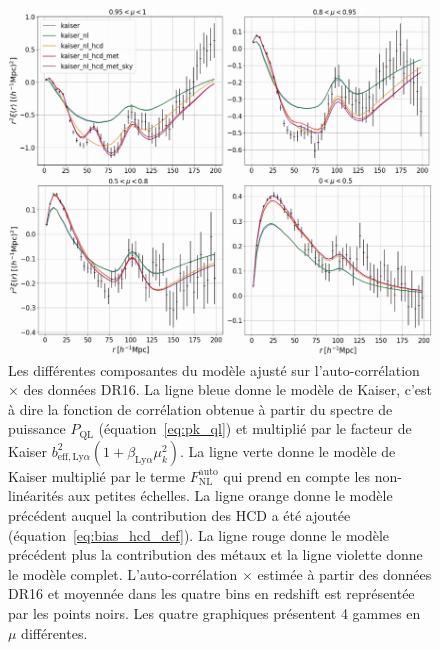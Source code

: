 \begin{figure}
  \centering
  \includegraphics[scale=0.5]{cf_models}
  \caption{Les différentes composantes du modèle ajusté sur l'auto-corrélation \lya{}$\times$\lya{} des données DR16.
    La ligne bleue donne le modèle de Kaiser, c'est à dire la fonction de corrélation obtenue à partir du spectre de puissance $P_{\mathrm{QL}}$ (équation~\ref{eq:pk_ql}) et multiplié par le facteur de Kaiser $b_{\mathrm{eff},\mathrm{Ly}\alpha}^2 (1 + \beta_{\mathrm{Ly}\alpha} \mu_k^2)$. La ligne verte donne le modèle de Kaiser multiplié par le terme $F_{\mathrm{NL}}^{\mathrm{auto}}$ qui prend en compte les non-linéarités aux petites échelles. La ligne orange donne le modèle précédent auquel la contribution des HCD a été ajoutée (équation~\ref{eq:bias_hcd_def}). La ligne rouge donne le modèle précédent plus la contribution des métaux et la ligne violette donne le modèle complet. L'auto-corrélation \lya{}$\times$\lya{} estimée à partir des données DR16 et moyennée dans les quatre bins en redshift est représentée par les points noirs.
Les quatre graphiques présentent 4 gammes en $\mu$ différentes.}
  \label{fig:cf_models}
\end{figure}

